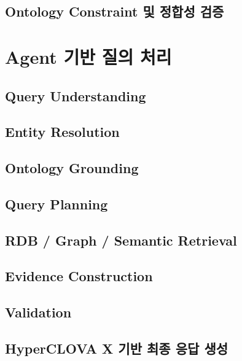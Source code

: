 \documentclass[11pt,a4paper]{article}
\begin{document}

\subsection{Ontology Constraint 및 정합성 검증}


\section{Agent 기반 질의 처리}

\subsection{Query Understanding}


\subsection{Entity Resolution}


\subsection{Ontology Grounding}


\subsection{Query Planning}


\subsection{RDB / Graph / Semantic Retrieval}


\subsection{Evidence Construction}


\subsection{Validation}


\subsection{HyperCLOVA X 기반 최종 응답 생성}
\end{document}
